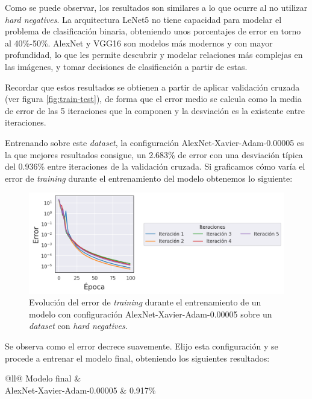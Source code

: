 Como se puede observar, los resultados son similares a lo que ocurre al no utilizar \textit{hard negatives}. La arquitectura LeNet5 no tiene capacidad para modelar el problema de clasificación binaria, obteniendo unos porcentajes de error en torno al 40\%-50\%. AlexNet y VGG16 son modelos más modernos y con mayor profundidad, lo que les permite descubrir y modelar relaciones más complejas en las imágenes, y tomar decisiones de clasificación a partir de estas. 

Recordar que estos resultados se obtienen a partir de aplicar validación cruzada (ver figura \ref{fig:train-test}), de forma que el error medio se calcula como la media de error de las 5 iteraciones que la componen y la desviación es la existente entre iteraciones.

Entrenando sobre este \textit{dataset}, la configuración AlexNet-Xavier-Adam-0.00005 es la que mejores resultados consigue, un 2.683\% de error con una desviación típica del 0.936\% entre iteraciones de la validación cruzada. Si graficamos cómo varía el error de \textit{training} durante el entrenamiento del modelo obtenemos lo siguiente:

\begin{figure}[H]
\centering
    \includegraphics[scale=0.67]{imagenes/image_classification/synthetic_dataset/loss_alexnet_xavier_adam_00005.png}
    \caption{Evolución del error de \textit{training} durante el entrenamiento de un modelo con configuración AlexNet-Xavier-Adam-0.00005 sobre un \textit{dataset} con \textit{hard negatives}.}
\end{figure}

Se observa como el error decrece suavemente. Elijo esta configuración y se procede a entrenar el modelo final, obteniendo los siguientes resultados:

\begin{table}[H]
    \footnotesize
    \centering
    \caption{Porcentaje de error del modelo final con \textit{hard negatives}.}
\begin{tabular}{@{}ll@{}}
\toprule
Modelo final              &  \\ \midrule
AlexNet-Xavier-Adam-0.00005 & 0.917\%                                                                                        \\ \bottomrule
\end{tabular}
\end{table}

